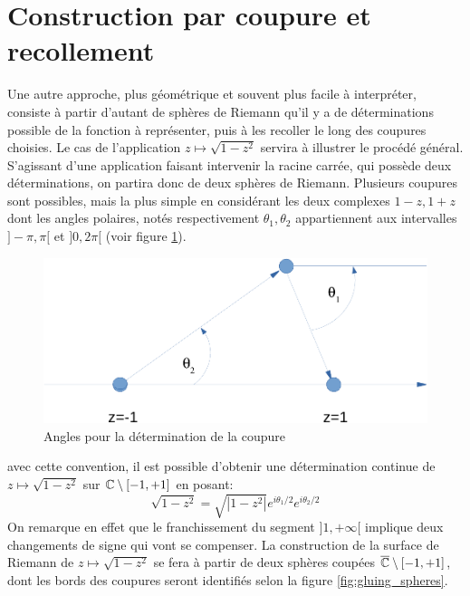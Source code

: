\section{Construction par coupure et recollement}
Une autre approche, plus géométrique et souvent plus facile à interpréter, consiste à partir d'autant de sphères de Riemann qu'il y a de déterminations possible de la fonction à représenter, puis à les recoller le long des coupures choisies. Le cas de l'application $z \mapsto \sqrt{1-z^2}$ servira à illustrer le procédé général. S'agissant d'une application faisant intervenir la racine carrée, qui possède deux déterminations, on partira donc de deux sphères de Riemann. Plusieurs coupures sont possibles, mais la plus simple en considérant les deux complexes $1-z,1+z$ dont les angles polaires, notés respectivement $\theta_1,\theta_2$ appartiennent aux intervalles $]-\pi,\pi[$  et $]0,2\pi[$ (voir figure \ref{fig:cut_angles}).
\begin{figure}[ht]
    \centering
    \includegraphics[scale=0.6]{images/riemann_exemple.pdf}
    \caption{Angles pour la détermination de la coupure}
    \label{fig:cut_angles}
\end{figure}
avec cette convention, il est possible d'obtenir une détermination continue de $z \mapsto \sqrt{1-z^2}$ sur $\mathbb{C} \setminus [-1,+1]$ en posant:
\[
\sqrt{1-z^2}=\sqrt{|1-z^2|}e^{i \theta_1/2}e^{i \theta_2/2}
\]
On remarque en effet que le franchissement du segment $]1,+\infty[$ implique deux changements de signe qui vont se compenser. La construction de la surface de Riemann de $z \mapsto \sqrt{1-z^2}$ se fera à partir de deux sphères coupées $\overline{\mathbb{C}} \setminus [-1,+1]$, dont les bords des coupures seront identifiés selon la figure  \ref{fig:gluing_spheres}.
